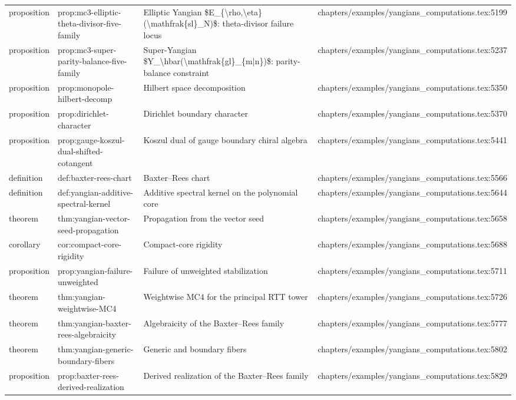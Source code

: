 \documentclass[11pt]{article}
\begin{document}
\begin{longtable}{L{0.10\textwidth}L{0.26\textwidth}L{0.42\textwidth}L{0.22\textwidth}}
proposition & prop:mc3-elliptic-theta-divisor-five-family & Elliptic Yangian \$E\_\{\textbackslash{}rho,\textbackslash{}eta\}(\textbackslash{}mathfrak\{sl\}\_N)\$: theta-divisor failure locus & chapters/examples/yangians\_computations.tex:5199\\
proposition & prop:mc3-super-parity-balance-five-family & Super-Yangian \$Y\_\textbackslash{}hbar(\textbackslash{}mathfrak\{gl\}\_\{m|n\})\$: parity-balance constraint & chapters/examples/yangians\_computations.tex:5237\\
proposition & prop:monopole-hilbert-decomp & Hilbert space decomposition & chapters/examples/yangians\_computations.tex:5350\\
proposition & prop:dirichlet-character & Dirichlet boundary character & chapters/examples/yangians\_computations.tex:5370\\
proposition & prop:gauge-koszul-dual-shifted-cotangent & Koszul dual of gauge boundary chiral algebra & chapters/examples/yangians\_computations.tex:5441\\
definition & def:baxter-rees-chart & Baxter--Rees chart & chapters/examples/yangians\_computations.tex:5566\\
definition & def:yangian-additive-spectral-kernel & Additive spectral kernel on the polynomial core & chapters/examples/yangians\_computations.tex:5644\\
theorem & thm:yangian-vector-seed-propagation & Propagation from the vector seed & chapters/examples/yangians\_computations.tex:5658\\
corollary & cor:compact-core-rigidity & Compact-core rigidity & chapters/examples/yangians\_computations.tex:5688\\
proposition & prop:yangian-failure-unweighted & Failure of unweighted stabilization & chapters/examples/yangians\_computations.tex:5711\\
theorem & thm:yangian-weightwise-MC4 & Weightwise MC4 for the principal RTT tower & chapters/examples/yangians\_computations.tex:5726\\
theorem & thm:yangian-baxter-rees-algebraicity & Algebraicity of the Baxter--Rees family & chapters/examples/yangians\_computations.tex:5777\\
theorem & thm:yangian-generic-boundary-fibers & Generic and boundary fibers & chapters/examples/yangians\_computations.tex:5802\\
proposition & prop:baxter-rees-derived-realization & Derived realization of the Baxter--Rees family & chapters/examples/yangians\_computations.tex:5829\\

\end{longtable}
\end{document}
